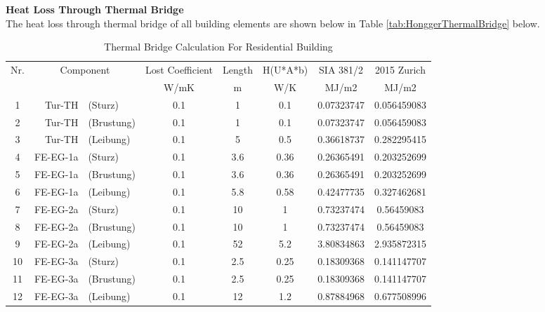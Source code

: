 \documentclass[a4paper, oneside]{discothesis}
\begin{document}
		\textbf{Heat Loss Through Thermal Bridge}\\
		The heat loss through thermal bridge of all building elements are shown below in Table \ref{tab:HonggerThermalBridge} below.
		\begin{table}[H]
		\small
		\centering
		\caption{Thermal Bridge Calculation For Residential Building}
		    \begin{tabular}{ccrccccc}
		    \toprule
		    \multicolumn{1}{l}{Nr.} & \multicolumn{2}{c}{Component} & Lost Coefficient & Length & H(U*A*b) & SIA 381/2 & 2015 Zurich \\
		         &      &      & W/mK & m    & W/K  & MJ/m2 & MJ/m2 \\
		    \midrule
		    1    & \multicolumn{1}{r}{Tur-TH} & \multicolumn{1}{l}{(Sturz)} & 0.1  & 1    & 0.1  & 0.07323747 & 0.056459083 \\
		    2    & \multicolumn{1}{r}{Tur-TH} & \multicolumn{1}{l}{(Brustung)} & 0.1  & 1    & 0.1  & 0.07323747 & 0.056459083 \\
		    3    & \multicolumn{1}{r}{Tur-TH} & \multicolumn{1}{l}{(Leibung)} & 0.1  & 5    & 0.5  & 0.36618737 & 0.282295415 \\
		    4    & \multicolumn{1}{r}{FE-EG-1a} & \multicolumn{1}{l}{(Sturz)} & 0.1  & 3.6  & 0.36 & 0.26365491 & 0.203252699 \\
		    5    & \multicolumn{1}{r}{FE-EG-1a} & \multicolumn{1}{l}{(Brustung)} & 0.1  & 3.6  & 0.36 & 0.26365491 & 0.203252699 \\
		    6    & \multicolumn{1}{r}{FE-EG-1a} & \multicolumn{1}{l}{(Leibung)} & 0.1  & 5.8  & 0.58 & 0.42477735 & 0.327462681 \\
		    7    & \multicolumn{1}{r}{FE-EG-2a} & \multicolumn{1}{l}{(Sturz)} & 0.1  & 10   & 1    & 0.73237474 & 0.56459083 \\
		    8    & \multicolumn{1}{r}{FE-EG-2a} & \multicolumn{1}{l}{(Brustung)} & 0.1  & 10   & 1    & 0.73237474 & 0.56459083 \\
		    9    & \multicolumn{1}{r}{FE-EG-2a} & \multicolumn{1}{l}{(Leibung)} & 0.1  & 52   & 5.2  & 3.80834863 & 2.935872315 \\
		    10   & \multicolumn{1}{r}{FE-EG-3a} & \multicolumn{1}{l}{(Sturz)} & 0.1  & 2.5  & 0.25 & 0.18309368 & 0.141147707 \\
		    11   & \multicolumn{1}{r}{FE-EG-3a} & \multicolumn{1}{l}{(Brustung)} & 0.1  & 2.5  & 0.25 & 0.18309368 & 0.141147707 \\
		    12   & \multicolumn{1}{r}{FE-EG-3a} & \multicolumn{1}{l}{(Leibung)} & 0.1  & 12   & 1.2  & 0.87884968 & 0.677508996 \\

\end{tabular}
\end{table}
\end{document}
